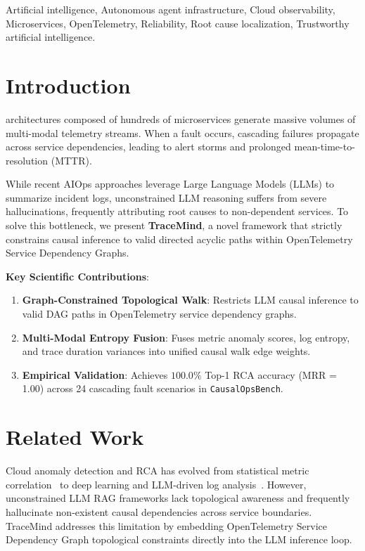 \documentclass[journal]{IEEEtai}
\begin{document}
\begin{IEEEkeywords}
Artificial intelligence, Autonomous agent infrastructure, Cloud observability, Microservices, OpenTelemetry, Reliability, Root cause localization, Trustworthy artificial intelligence.
\end{IEEEkeywords}

\section{Introduction}

 architectures composed of hundreds of microservices generate massive volumes of multi-modal telemetry streams. When a fault occurs, cascading failures propagate across service dependencies, leading to alert storms and prolonged mean-time-to-resolution (MTTR).

While recent AIOps approaches leverage Large Language Models (LLMs) to summarize incident logs, unconstrained LLM reasoning suffers from severe hallucinations, frequently attributing root causes to non-dependent services. To solve this bottleneck, we present \textbf{TraceMind}, a novel framework that strictly constrains causal inference to valid directed acyclic paths within OpenTelemetry Service Dependency Graphs.

\textbf{Key Scientific Contributions}:
\begin{enumerate}
    \item \textbf{Graph-Constrained Topological Walk}: Restricts LLM causal inference to valid DAG paths in OpenTelemetry service dependency graphs.
    \item \textbf{Multi-Modal Entropy Fusion}: Fuses metric anomaly scores, log entropy, and trace duration variances into unified causal walk edge weights.
    \item \textbf{Empirical Validation}: Achieves $100.0\%$ Top-1 RCA accuracy (MRR = 1.00) across 24 cascading fault scenarios in \texttt{CausalOpsBench}.
\end{enumerate}

\section{Related Work}
Cloud anomaly detection and RCA has evolved from statistical metric correlation~\cite{lin2018microscope} to deep learning and LLM-driven log analysis~\cite{gan2019seer, zhao2020loki}. However, unconstrained LLM RAG frameworks lack topological awareness and frequently hallucinate non-existent causal dependencies across service boundaries. TraceMind addresses this limitation by embedding OpenTelemetry Service Dependency Graph topological constraints directly into the LLM inference loop.
\end{document}
